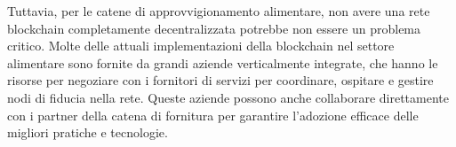 Tuttavia, per le catene di approvvigionamento alimentare, non avere una rete blockchain completamente decentralizzata potrebbe non essere un problema critico. Molte delle attuali implementazioni della blockchain nel settore alimentare sono fornite da grandi aziende verticalmente integrate, che hanno le risorse per negoziare con i fornitori di servizi per coordinare, ospitare e gestire nodi di fiducia nella rete. Queste aziende possono anche collaborare direttamente con i partner della catena di fornitura per garantire l'adozione efficace delle migliori pratiche e tecnologie.
